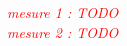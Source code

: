 \renewcommand{\songbookcomment}[1]{%
      \textcolor{red}{\textit{#1}}%
}

\songbookcomment{mesure 1 : TODO} \\
\songbookcomment{mesure 2 : TODO} \\
